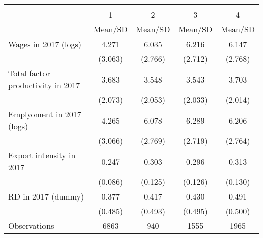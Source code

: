 {
\def\sym#1{\ifmmode^{#1}\else\(^{#1}\)\fi}
\begin{tabular}{l*{4}{c}}
\hline\hline
                    &\multicolumn{4}{c}{}                               \\
                    &           1&           2&           3&           4\\
                    &     Mean/SD&     Mean/SD&     Mean/SD&     Mean/SD\\
\hline
Wages in 2017 (logs)&       4.271&       6.035&       6.216&       6.147\\
                    &     (3.063)&     (2.766)&     (2.712)&     (2.768)\\
Total factor productivity in 2017&       3.683&       3.548&       3.543&       3.703\\
                    &     (2.073)&     (2.053)&     (2.033)&     (2.014)\\
Emplyoment in 2017 (logs)&       4.265&       6.078&       6.289&       6.206\\
                    &     (3.066)&     (2.769)&     (2.719)&     (2.764)\\
Export intensity in 2017&       0.247&       0.303&       0.296&       0.313\\
                    &     (0.086)&     (0.125)&     (0.126)&     (0.130)\\
RD in 2017 (dummy)  &       0.377&       0.417&       0.430&       0.491\\
                    &     (0.485)&     (0.493)&     (0.495)&     (0.500)\\
\hline
Observations        &       6863&     940       &    1555        &    1965        \\
\hline\hline
\end{tabular}
}
